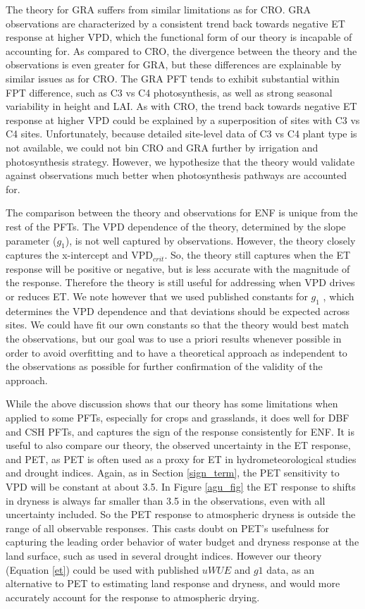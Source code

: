 \documentclass[draft,linenumbers]{gcbjournal}
\begin{document}
The theory for GRA suffers from similar limitations as for CRO. GRA observations are characterized by a consistent trend back towards negative ET response at higher VPD, which the functional form of our theory is incapable of accounting for. As compared to CRO, the divergence between the theory and the observations is even greater for GRA, but these differences are explainable by similar issues as for CRO. The GRA PFT tends to exhibit substantial within FPT difference, such as C3 vs C4 photosynthesis, as well as strong seasonal variability in height and LAI. As with CRO, the trend back towards negative ET response at higher VPD could be explained by a superposition of sites with C3 vs C4 sites. Unfortunately, because detailed site-level data of C3 vs C4 plant type is not available, we could not bin CRO and GRA further by irrigation and photosynthesis strategy. However, we hypothesize that the theory would validate against observations much better when photosynthesis pathways are accounted for. 

The comparison between the theory and observations for ENF is unique from the rest of the PFTs. The VPD dependence of the theory, determined by the slope parameter ($g_1$), is not well captured by observations. However, the theory closely captures the x-intercept and VPD$_{crit}$. So, the theory still captures when the ET response will be positive or negative, but is less accurate with the magnitude of the response. Therefore the theory is still useful for addressing when VPD drives or reduces ET. We note however that we used published constants for $g_1$ \citep[from ][]{Lin_2015}, which determines the VPD dependence and that deviations should be expected across sites. We could have fit our own constants so that the theory would best match the observations, but our goal was to use a priori results whenever possible in order to avoid overfitting and to have a theoretical approach as independent to the observations as possible for further confirmation of the validity of the approach.

While the above discussion shows that our theory has some limitations when applied to some PFTs, especially for crops and grasslands, it does well for DBF and CSH PFTs, and captures the sign of the response consistently for ENF. It is useful to also compare our theory, the observed uncertainty in the ET response, and PET, as PET is often used as a proxy for ET in hydrometeorological studies and drought indices. Again, as in Section \ref{sign_term}, the PET sensitivity to VPD will be constant at about 3.5. In Figure \ref{agu_fig} the ET response to shifts in dryness is always far smaller than 3.5 in the observations, even with all uncertainty included. So the PET response to atmospheric dryness is outside the range of all observable responses. This casts doubt on PET's usefulness for capturing the leading order behavior of water budget and dryness response at the land surface, such as used in several drought indices. However our theory (Equation \ref{et}) could be used with published $uWUE$ and $g1$ data, as an alternative to PET to estimating land response and dryness, and would more accurately account for the response to atmospheric drying.
\end{document}
